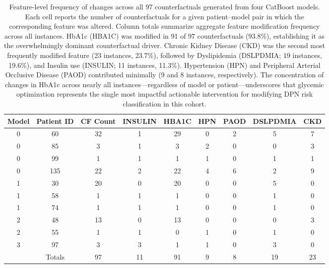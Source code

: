 \documentclass[pdflatex,sn-vancouver-num]{sn-jnl}
\begin{document}

\begin{table}[h]
\footnotesize
\centering
\begin{tabular}{ccccccccc}
\toprule
Model & Patient ID & CF Count & INSULIN & HBA1C & HPN & PAOD & DSLPDMIA & CKD \\
\midrule
0 & 60 & 32 & 1 & 29 & 0 & 2 & 5 & 7 \\
0 & 85 & 3 & 1 & 3 & 2 & 0 & 0 & 3 \\
0 & 99 & 1 & 1 & 1 & 1 & 0 & 1 & 1 \\
0 & 135 & 22 & 2 & 22 & 4 & 6 & 2 & 9 \\
1 & 30 & 20 & 0 & 20 & 0 & 0 & 5 & 0 \\
1 & 58 & 1 & 1 & 1 & 0 & 0 & 1 & 0 \\
1 & 74 & 1 & 1 & 1 & 0 & 0 & 1 & 0 \\
2 & 48 & 13 & 0 & 13 & 0 & 0 & 0 & 3 \\
2 & 55 & 1 & 1 & 0 & 1 & 0 & 1 & 0 \\
3 & 97 & 3 & 3 & 1 & 1 & 0 & 3 & 0 \\
\midrule
 & Totals & 97 & 11 & 91 & 9 & 8 & 19 & 23 \\
\bottomrule
\end{tabular}
\caption{Feature-level frequency of changes across all 97 counterfactuals generated from four CatBoost models. Each cell reports the number of counterfactuals for a given patient–model pair in which the corresponding feature was altered. Column totals summarize aggregate feature modification frequency across all instances. HbA1c (HBA1C) was modified in 91 of 97 counterfactuals (93.8\%), establishing it as the overwhelmingly dominant counterfactual driver. Chronic Kidney Disease (CKD) was the second most frequently modified feature (23 instances, 23.7\%), followed by Dyslipidemia (DSLPDMIA; 19 instances, 19.6\%), and Insulin use (INSULIN; 11 instances, 11.3\%). Hypertension (HPN) and Peripheral Arterial Occlusive Disease (PAOD) contributed minimally (9 and 8 instances, respectively). The concentration of changes in HbA1c across nearly all instances—regardless of model or patient—underscores that glycemic optimization represents the single most impactful actionable intervention for modifying DPN risk classification in this cohort. 
}
\label{tab:localcf-changed}
\end{table}
\end{document}
